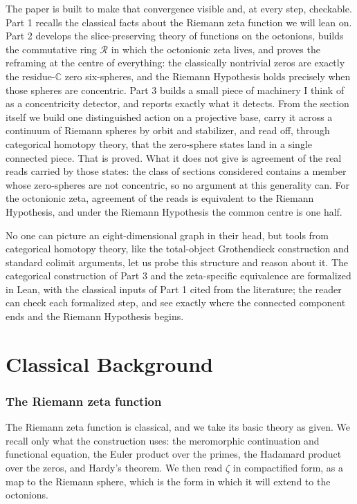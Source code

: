 \documentclass[11pt]{article}
\newcommand{\CC}{\mathbb{C}}
\theoremstyle{plain}
\theoremstyle{definition}
\theoremstyle{remark}
\begin{document}
The paper is built to make that convergence visible and, at every step, checkable. Part 1 recalls the classical facts about the Riemann zeta function we will lean on. Part 2 develops the slice-preserving theory of functions on the octonions, builds the commutative ring $\mathcal R$ in which the octonionic zeta lives, and proves the reframing at the centre of everything: the classically nontrivial zeros are exactly the residue-$\CC$ zero six-spheres, and the Riemann Hypothesis holds precisely when those spheres are concentric. Part 3 builds a small piece of machinery I think of as a concentricity detector, and reports exactly what it detects. From the section itself we build one distinguished action on a projective base, carry it across a continuum of Riemann spheres by orbit and stabilizer, and read off, through categorical homotopy theory, that the zero-sphere states land in a single connected piece. That is proved. What it does not give is agreement of the real reads carried by those states: the class of sections considered contains a member whose zero-spheres are not concentric, so no argument at this generality can. For the octonionic zeta, agreement of the reads is equivalent to the Riemann Hypothesis, and under the Riemann Hypothesis the common centre is one half.

No one can picture an eight-dimensional graph in their head, but tools from categorical homotopy theory, like the total-object Grothendieck construction and standard colimit arguments, let us probe this structure and reason about it. The categorical construction of Part 3 and the zeta-specific equivalence are formalized in Lean, with the classical inputs of Part 1 cited from the literature; the reader can check each formalized step, and see exactly where the connected component ends and the Riemann Hypothesis begins.

\part{Classical Background}
\section{The Riemann zeta function}

The Riemann zeta function is classical, and we take its basic theory as given. We recall only what
the construction uses: the meromorphic continuation and functional equation, the Euler product over
the primes, the Hadamard product over the zeros, and Hardy's theorem. We then read $\zeta$ in
compactified form, as a map to the Riemann sphere, which is the form in which it will extend to the
octonions.
\end{document}
